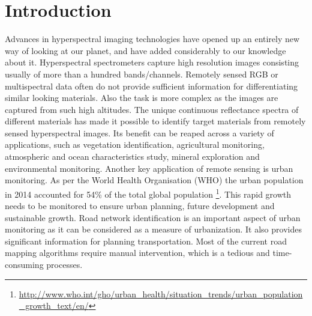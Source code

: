 \documentclass[12pt,twoside]{article}
\theoremstyle{plain}
\theoremstyle{definition}
\theoremstyle{remark}
\begin{document}


\section{Introduction}
\label{sec:introduction}
Advances in hyperspectral imaging technologies have opened up an entirely new way of looking at our planet, and have added considerably to our knowledge about it. Hyperspectral spectrometers capture high resolution images consisting usually of more than a hundred bands/channels. Remotely sensed RGB or multispectral data often do not provide sufficient information for differentiating similar looking materials. Also the task is more complex as the images are captured from such high altitudes. The unique continuous reflectance spectra of different materials has made it possible to identify target materials from remotely sensed hyperspectral images. Its benefit can be reaped across a variety of applications, such as vegetation identification, agricultural monitoring, atmospheric and ocean characteristics study, mineral exploration and environmental monitoring. Another key application of remote sensing is urban monitoring. As per the World Health Organisation (WHO) the urban population in 2014 accounted for 54\% of  the total global population \footnote{\url{http://www.who.int/gho/urban_health/situation_trends/urban_population_growth_text/en/}}. This rapid growth needs to be monitored to ensure urban planning, future development and sustainable growth. 
Road network identification is an important aspect of urban monitoring as it can be considered as a measure of urbanization. It also provides significant information for planning transportation. Most of the current road mapping algorithms require manual intervention, which is a tedious and time-consuming processes.\\
\end{document}
